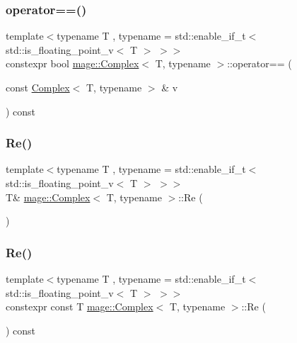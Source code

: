 \subsubsection{\texorpdfstring{operator==()}{operator==()}}
{\footnotesize\ttfamily template$<$typename T , typename  = std\+::enable\+\_\+if\+\_\+t$<$ std\+::is\+\_\+floating\+\_\+point\+\_\+v$<$ T $>$ $>$$>$ \\
constexpr bool \mbox{\hyperlink{structmage_1_1_complex}{mage\+::\+Complex}}$<$ T, typename $>$\+::operator== (\begin{DoxyParamCaption}\item[{const \mbox{\hyperlink{structmage_1_1_complex}{Complex}}$<$ T, typename $>$ \&}]{v }\end{DoxyParamCaption}) const}

\mbox{\label{structmage_1_1_complex_a5c48df5c9153a670122fb9e04f7bb1da}} 
\subsubsection{\texorpdfstring{Re()}{Re()}\hspace{0.1cm}{\footnotesize\ttfamily [1/2]}}
{\footnotesize\ttfamily template$<$typename T , typename  = std\+::enable\+\_\+if\+\_\+t$<$ std\+::is\+\_\+floating\+\_\+point\+\_\+v$<$ T $>$ $>$$>$ \\
T\& \mbox{\hyperlink{structmage_1_1_complex}{mage\+::\+Complex}}$<$ T, typename $>$\+::Re (\begin{DoxyParamCaption}{ }\end{DoxyParamCaption})\hspace{0.3cm}{\ttfamily [noexcept]}}

\mbox{\label{structmage_1_1_complex_a3dfd0ae672c5b5763341c9d2d1192df8}} 
\subsubsection{\texorpdfstring{Re()}{Re()}\hspace{0.1cm}{\footnotesize\ttfamily [2/2]}}
{\footnotesize\ttfamily template$<$typename T , typename  = std\+::enable\+\_\+if\+\_\+t$<$ std\+::is\+\_\+floating\+\_\+point\+\_\+v$<$ T $>$ $>$$>$ \\
constexpr const T \mbox{\hyperlink{structmage_1_1_complex}{mage\+::\+Complex}}$<$ T, typename $>$\+::Re (\begin{DoxyParamCaption}{ }\end{DoxyParamCaption}) const\hspace{0.3cm}{\ttfamily [noexcept]}}

